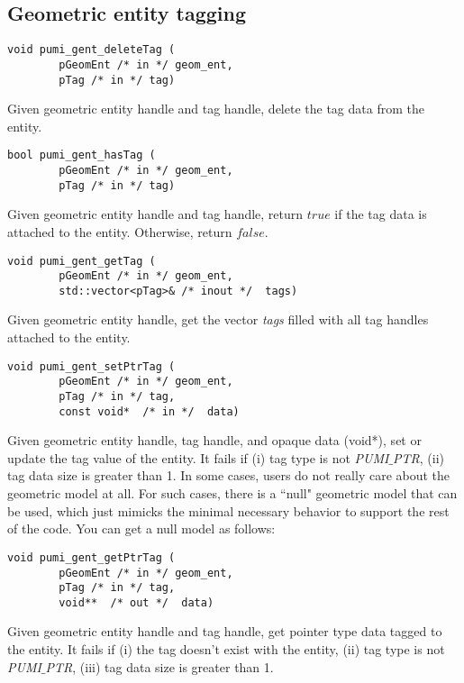 \subsection{Geometric entity tagging}
\begin{verbatim}
void pumi_gent_deleteTag (
        pGeomEnt /* in */ geom_ent, 
        pTag /* in */ tag)
\end{verbatim}\vspace{-.5cm}\hspace{1cm}
        Given geometric entity handle and tag handle, delete the tag data from the entity.

\begin{verbatim}
bool pumi_gent_hasTag (
        pGeomEnt /* in */ geom_ent, 
        pTag /* in */ tag)     
\end{verbatim}\vspace{-.5cm}\hspace{1cm}
        Given geometric entity handle and tag handle, return $true$ if the tag data is attached to the entity. Otherwise, return $false$.

\begin{verbatim}
void pumi_gent_getTag (
        pGeomEnt /* in */ geom_ent, 
        std::vector<pTag>& /* inout */  tags)     
\end{verbatim}\vspace{-.5cm}\hspace{1cm}
        Given geometric entity handle, get the vector \emph{tags} filled with all tag handles attached to the entity.

\begin{verbatim}
void pumi_gent_setPtrTag (
        pGeomEnt /* in */ geom_ent, 
        pTag /* in */ tag,
        const void*  /* in */  data)
\end{verbatim}\vspace{-.5cm}\hspace{1cm}
        Given geometric entity handle, tag handle, and opaque data (void*), set or update the tag value of the entity.  It fails if (i) tag type is not \emph{PUMI}$\_$\emph{PTR}, (ii) tag data size is greater than 1.
In some cases, users do not really care about the geometric model at
all.
For such cases, there is a ``null" geometric model that can be used,
which just mimicks the minimal necessary behavior to support
the rest of the code.
You can get a null model as follows:
\begin{verbatim}
void pumi_gent_getPtrTag (
        pGeomEnt /* in */ geom_ent, 
        pTag /* in */ tag,
        void**  /* out */  data)
\end{verbatim}\vspace{-.5cm}\hspace{1cm}
        Given geometric entity handle and tag handle, get pointer type data tagged to the entity. It fails if (i) the tag doesn't exist with the entity, (ii) tag type is not \emph{PUMI}$\_$\emph{PTR}, (iii) tag data size is greater than 1.

